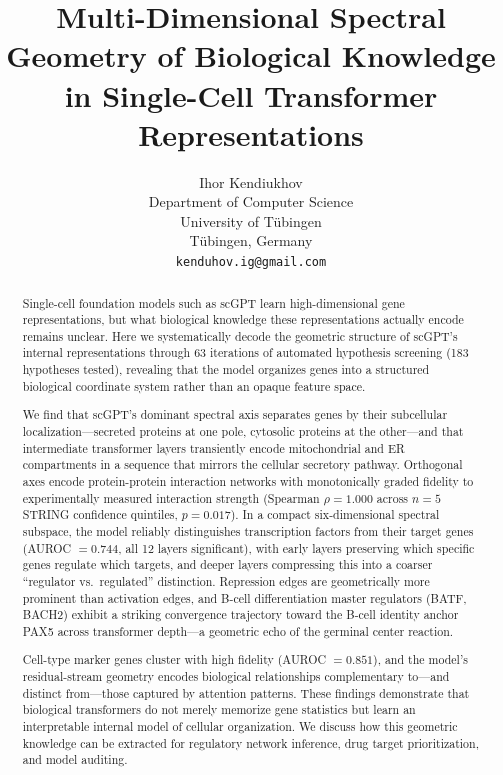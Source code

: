 \documentclass[10pt,twocolumn]{article}
\title{Multi-Dimensional Spectral Geometry of Biological Knowledge\\in Single-Cell Transformer Representations}
\author{%
  Ihor Kendiukhov\\
  \small Department of Computer Science\\
  \small University of T\"ubingen\\
  \small T\"ubingen, Germany\\
  \small \texttt{kenduhov.ig@gmail.com}
}
\date{}
\begin{document}
\maketitle

\begin{abstract}
Single-cell foundation models such as scGPT learn high-dimensional gene representations, but what biological knowledge these representations actually encode remains unclear.
Here we systematically decode the geometric structure of scGPT's internal representations through 63 iterations of automated hypothesis screening (183 hypotheses tested), revealing that the model organizes genes into a structured biological coordinate system rather than an opaque feature space.

We find that scGPT's dominant spectral axis separates genes by their subcellular localization---secreted proteins at one pole, cytosolic proteins at the other---and that intermediate transformer layers transiently encode mitochondrial and ER compartments in a sequence that mirrors the cellular secretory pathway.
Orthogonal axes encode protein-protein interaction networks with monotonically graded fidelity to experimentally measured interaction strength (Spearman $\rho = 1.000$ across $n = 5$ STRING confidence quintiles, $p = 0.017$).
In a compact six-dimensional spectral subspace, the model reliably distinguishes transcription factors from their target genes (AUROC $= 0.744$, all 12 layers significant), with early layers preserving which specific genes regulate which targets, and deeper layers compressing this into a coarser ``regulator vs.\ regulated'' distinction.
Repression edges are geometrically more prominent than activation edges, and B-cell differentiation master regulators (BATF, BACH2) exhibit a striking convergence trajectory toward the B-cell identity anchor PAX5 across transformer depth---a geometric echo of the germinal center reaction.

Cell-type marker genes cluster with high fidelity (AUROC $= 0.851$), and the model's residual-stream geometry encodes biological relationships complementary to---and distinct from---those captured by attention patterns.
These findings demonstrate that biological transformers do not merely memorize gene statistics but learn an interpretable internal model of cellular organization.
We discuss how this geometric knowledge can be extracted for regulatory network inference, drug target prioritization, and model auditing.
\end{abstract}
\end{document}
